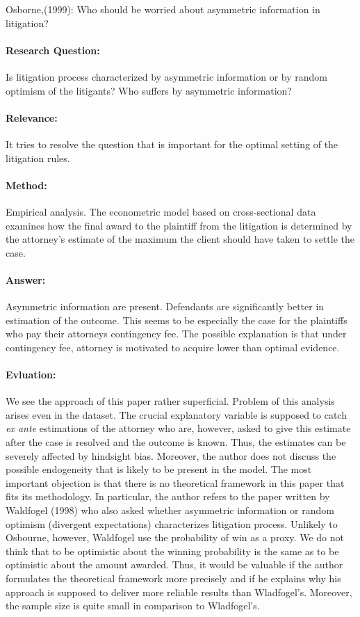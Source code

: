 \documentclass[12pt,english]{article}%
\makeatletter
\renewcommand{\section}{\@startsection{section}{1}{0mm}{-1.5\baselineskip}{0.8\baselineskip}{\normalfont\large\centering}}
\makeatother
\begin{document}
\section{Litigation}
	 Osborne,(1999): Who should be worried about asymmetric information in litigation?
	 \paragraph{Research Question:} Is litigation process characterized by asymmetric information or by random optimism of the litigants? Who suffers by asymmetric information?  
	 \paragraph{Relevance:}It tries to resolve the question that is important for the optimal setting of the litigation rules.
	 \paragraph{Method:}Empirical analysis. The econometric model based on cross-sectional data examines how the final award to the plaintiff from the litigation is determined by the attorney's estimate of the maximum the client should have taken to settle the case.   
	 \paragraph{Answer:}Asymmetric information are present. Defendants are significantly better in estimation of the outcome. This seems to be especially the case for the plaintiffs who pay their attorneys contingency fee. The possible explanation is that under contingency fee, attorney is motivated to acquire lower than optimal evidence. 
	 \paragraph{Evluation:}We see the approach of this paper rather superficial. Problem of this analysis arises even in the dataset. The crucial explanatory variable is supposed to catch \textit{ex ante} estimations of the attorney who are, however, asked to give this estimate after the case is resolved and the outcome is known. Thus, the estimates can be severely affected by hindsight bias. Moreover, the author does not discuss the possible endogeneity that is likely to be present in the model. The most important objection is that there is no theoretical framework in this paper that fits its methodology. In particular, the author refers to the paper written by Waldfogel (1998) who also asked whether asymmetric information or random optimism (divergent expectations) characterizes litigation process. Unlikely to Osbourne, however, Waldfogel use the probability of win as a proxy. We do not think that to be optimistic about the winning probability is the same as to be optimistic about the amount awarded. Thus, it would be valuable if the author formulates the theoretical framework more precisely and if he explains why his approach is supposed to deliver more reliable results than Wladfogel's. Moreover, the sample size is quite small in comparison to Wladfogel's.	 	 
	   
\end{document}

